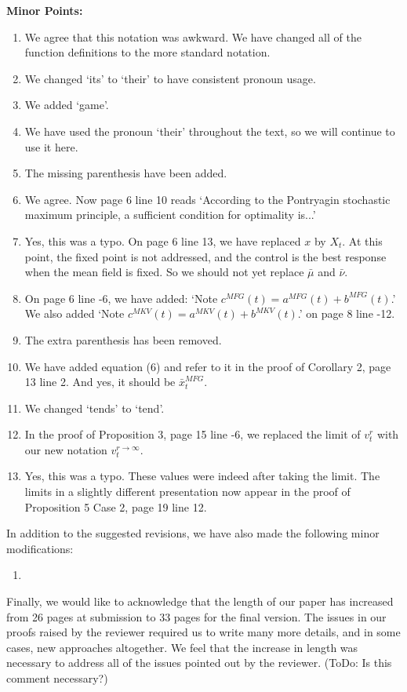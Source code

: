 \documentclass[]{article}
\begin{document}
\hspace{-7mm} \textbf{Minor Points:}
\begin{enumerate}
	\item We agree that this notation was awkward. We have changed all of the function definitions to the more standard notation.
	\item We changed `its' to `their' to have consistent pronoun usage.
	\item We added `game'.
	\item We have used the pronoun `their' throughout the text, so we will continue to use it here.
	\item The missing parenthesis have been added.
	\item We agree. Now page 6 line 10 reads `According to the Pontryagin stochastic maximum principle, a sufficient condition for optimality is...'
	\item Yes, this was a typo. On page 6 line 13, we have replaced $x$ by $X_t$. At this point, the fixed point is not addressed, and the control is the best response when the mean field is fixed. So we should not yet replace $\bar{\mu}$ and $\bar{\nu}$.
	\item On page 6 line -6, we have added: `Note $c^{MFG}(t)=a^{MFG}(t)+b^{MFG}(t)$.' We also added `Note $c^{MKV}(t)=a^{MKV}(t)+b^{MKV}(t)$.' on page 8 line -12.
	\item The extra parenthesis has been removed.
	\item We have added equation (6) and refer to it in the proof of Corollary 2, page 13 line 2. And yes, it should be $\bar{x}_t^{MFG}$.
	\item We changed `tends' to `tend'.
	\item In the proof of Proposition 3, page 15 line -6, we replaced the limit of $v^r_t$ with our new notation $v^{r \to \infty}_t$.
	\item Yes, this was a typo. These values were indeed after taking the limit. The limits in a slightly different presentation now appear in the proof of Proposition 5 Case 2, page 19 line 12.
\end{enumerate}

\hspace{-7mm} In addition to the suggested revisions, we have also made the following minor modifications:
\begin{enumerate}
	\item 
\end{enumerate}

Finally, we would like to acknowledge that the length of our paper has increased from 26 pages at submission to 33 pages for the final version. The issues in our proofs raised by the reviewer required us to write many more details, and in some cases, new approaches altogether. We feel that the increase in length was necessary to address all of the issues pointed out by the reviewer. (ToDo: Is this comment necessary?)
\end{document}
